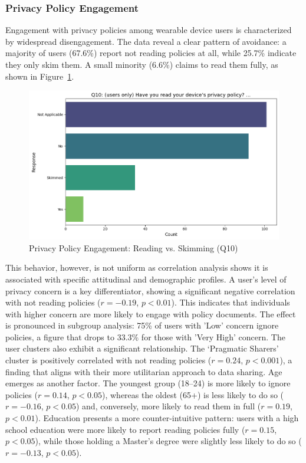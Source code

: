 	\subsubsection{Privacy Policy Engagement}
	Engagement with privacy policies among wearable device users is characterized by widespread disengagement. The data reveal a clear pattern of avoidance: a majority of users (67.6\%) report not reading policies at all, while 25.7\% indicate they only skim them. A small minority (6.6\%) claims to read them fully, as shown in Figure~\ref{fig:Q10_policy_engagement}.
	\begin{figure}[ht]\centering
		\includegraphics[width=1\linewidth]{figures/questions/Q10_single_choice.png}
		\caption{Privacy Policy Engagement: Reading vs. Skimming (Q10)}
		\label{fig:Q10_policy_engagement}
	\end{figure}
	This behavior, however, is not uniform as correlation analysis shows it is associated with specific attitudinal and demographic profiles. A user's level of privacy concern is a key differentiator, showing a significant negative correlation with not reading policies ($r = -0.19$, $p < 0.01$). This indicates that individuals with higher concern are more likely to engage with policy documents. The effect is pronounced in subgroup analysis: 75\% of users with 'Low' concern ignore policies, a figure that drops to 33.3\% for those with 'Very High' concern.
	The user clusters also exhibit a significant relationship. The `Pragmatic Sharers' cluster is positively correlated with not reading policies ($r = 0.24$, $p < 0.001$), a finding that aligns with their more utilitarian approach to data sharing.
	Age emerges as another factor. The youngest group (18--24) is more likely to ignore policies ($r = 0.14$, $p < 0.05$), whereas the oldest (65+) is less likely to do so ($r = -0.16$, $p < 0.05$) and, conversely, more likely to read them in full ($r = 0.19$, $p < 0.01$). Education presents a more counter-intuitive pattern: users with a high school education were more likely to report reading policies fully ($r = 0.15$, $p < 0.05$), while those holding a Master's degree were slightly less likely to do so ($r = -0.13$, $p < 0.05$).	

